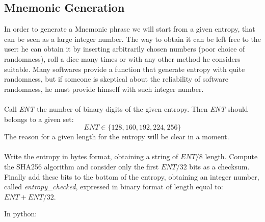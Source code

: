 \subsection{Mnemonic Generation}
In order to generate a Mnemonic phrase we will start from a given entropy, that can be seen as a large integer number. The way to obtain it can be left free to the user: he can obtain it by inserting arbitrarily chosen numbers (poor choice of randomness), roll a dice many times or with any other method he considers suitable. Many softwares provide a function that generate entropy with quite randomness, but if someone is skeptical about the reliability of software randomness, he must provide himself with such integer number.
\\ \\
Call \textit{ENT} the number of binary digits of the given entropy. Then \textit{ENT} should belongs to a given set:
\begin{equation*}
	ENT \in \{128,160,192,224,256\}
\end{equation*}
The reason for a given length for the entropy will be clear in a moment.
\\ \\
Write the entropy in bytes format, obtaining a string of $ENT/8$ length. Compute the SHA256 algorithm and consider only the first $ENT/32$ bits as a checksum. Finally add these bits to the bottom of the entropy, obtaining an integer number, called \textit{entropy\_checked}, expressed in binary format of length equal to: $ENT+ENT/32$.

\begin{flushleft}
	In python:
\end{flushleft}


